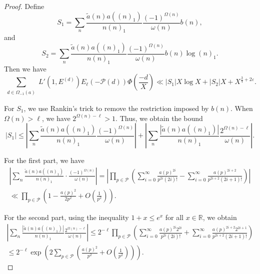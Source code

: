 \documentclass[12pt,reqno]{amsart}
\numberwithin{equation}{section}
\theoremstyle{plain}
\theoremstyle{definition}
\theoremstyle{remark}
\begin{document}
\begin{proof}
Define
\begin{equation*}
  S_1 =
  \sum_{n}
  \frac{\tilde{a}(n) a((n)_1)}{n (n)_1}
\frac{(-1)^{\Omega(n)}}{\omega(n)}
b(n),
\end{equation*}
and
\begin{equation*}
  S_2 =
  \sum_{n}
  \frac{\tilde{a}(n) a((n)_1)}{n (n)_1}
 \frac{(-1)^{\Omega(n)}}{\omega(n)}
 b(n) \log (n)_1.
\end{equation*}
Then we have
\begin{equation*}
\sum_{\substack{d \in \Omega_{-1}(a)}}
L'(1, E^{(d)})
E_{\ell}(-\mathcal{P}(d))
\Phi\left(\frac{-d}{X}\right)
\ll |S_1|X\log X+|S_2|X+X^{\frac{3}{4} + 2\varepsilon}.
\end{equation*}

For \( S_1 \), we use Rankin's trick to remove the restriction imposed by \( b(n) \).
When \( \Omega(n) > \ell \), we have \( 2^{\Omega(n) - \ell} > 1 \).
Thus, we obtain the bound
\begin{equation*}
  |S_1| \leq
  \left| \sum_{n}
  \frac{\tilde{a}(n) a((n)_1)}{n (n)_1}
 \frac{(-1)^{\Omega(n)}}{\omega(n)} \right|
  + \left| \sum_{n}
  \frac{|\tilde{a}(n) a((n)_1)| }{n (n)_1 }
  \frac{2^{\Omega(n) - \ell}}{\omega(n)}\right|.
\end{equation*}

For the first part, we have
\begin{multline*}
  \left| \sum_{n}
  \frac{\tilde{a}(n) a((n)_1)}{n (n)_1}
  \cdot \frac{(-1)^{\Omega(n)}}{\omega(n)} \right|
  =
  \left| \prod_{p \in \mathcal{P}}
  \left( \sum_{i=0}^{\infty}
  \frac{a(p)^{2i}}{p^{2i} (2i)!}
  - \sum_{i=0}^{\infty}
  \frac{a(p)^{2i+2}}{p^{2i+2} (2i+1)!} \right) \right|
  \\ \ll
   \prod_{p \in \mathcal{P}}
  \left( 1 - \frac{a(p)^2}{2p^2} + O\left( \frac{1}{p^2} \right) \right).
\end{multline*}

For the second part, using the inequality \( 1 + x \leq e^x \) for all \( x \in \mathbb{R} \), we obtain
\begin{multline*}
\left| \sum_{n}
  \frac{|\tilde{a}(n) a((n)_1)| }{n (n)_1 }
 \frac{2^{\Omega(n) - \ell}}{\omega(n)} \right|
  \leq
  2^{-\ell}
  \prod_{p \in \mathcal{P}}
  \left( \sum_{i=0}^{\infty}
  \frac{a(p)^{2i} 2^{2i}}{p^{2i} (2i)!}
  + \sum_{i=0}^{\infty}
  \frac{a(p)^{2i+2}  2^{2i+1}}{p^{2i+2} (2i+1)!} \right)
  \\ \leq
  2^{-\ell} \exp\left(
  2 \sum_{p \in \mathcal{P}}
  \left( \frac{a(p)^2}{p^2} + O\left( \frac{1}{p^2} \right) \right)
  \right).
\end{multline*}


\end{proof}
\end{document}
